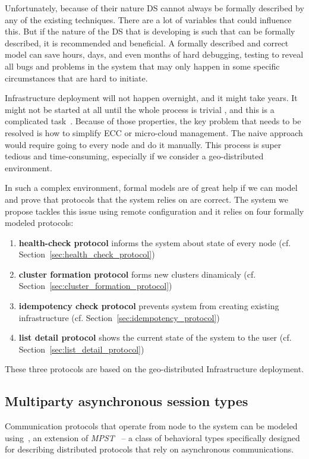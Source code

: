 Unfortunately, because of their nature DS cannot always be formally described by any of the existing techniques. There are a lot of variables that could influence this. But if the nature of the DS that is developing is such that can be formally described, it is recommended and beneficial. A formally described and correct model can save hours, days, and even months of hard debugging, testing to reveal all bugs and problems in the system that may only happen in some specific circumstances that are hard to initiate.

Infrastructure deployment will not happen overnight, and it might take years. It might not be started at all until the whole process is trivial \cite{SatyanarayananBCD09}, and this is a complicated task~\cite{JararwehDAAAB16}. Because of those properties, the key problem that needs to be resolved is how to simplify ECC or micro-cloud management. The naive approach would require going to every node and do it manually. This process is super tedious and time-consuming, especially if we consider a geo-distributed environment. 

In such a complex environment, formal models are of great help if we can model and prove that protocols that the system relies on are correct. The system we propose tackles this issue using remote configuration and it relies on four formally modeled protocols:

\begin{enumerate}[start=1,label={(\bfseries \arabic*)}]
	\item \textbf{health-check protocol} informs the system about state of every node (cf. Section~\ref{sec:health_check_protocol})
	\item \textbf{cluster formation protocol} forms new clusters dinamicaly (cf. Section~\ref{sec:cluster_formation_protocol})
	\item \textbf{idempotency check protocol} prevents system from creating existing infrastructure (cf. Section~\ref{sec:idempotency_protocol})
	\item \textbf{list detail protocol} shows the current state of the system to the user (cf. Section~\ref{sec:list_detail_protocol})
\end{enumerate}

\noindent
These three protocols are based on the geo-distributed Infrastructure deployment.
%
%
\subsection{Multiparty asynchronous session types}\label{sec:multiparty}
%
Communication protocols that operate from node to the system can be modeled using~\cite{HuY17}, an extension of \emph{MPST}~\cite{HondaYC08} -- a class of behavioral types specifically designed for describing distributed protocols that rely on asynchronous communications. 

